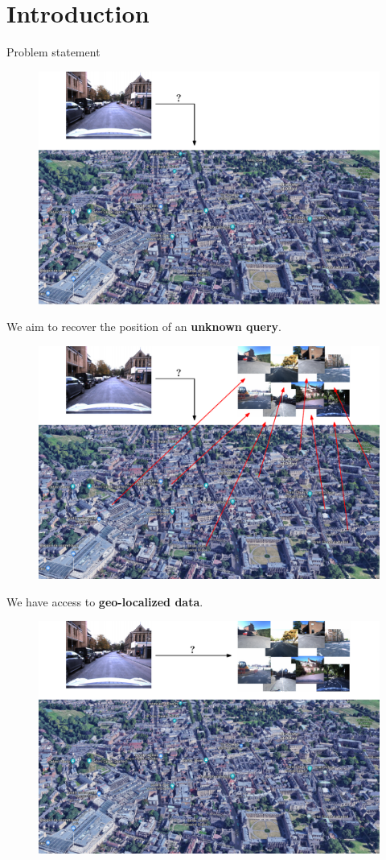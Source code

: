 \section{Introduction}

\label{sec:intro}

\begin{frame}{Problem statement}
	\only<1>
	{
	\vfill
	\begin{figure}
		\includegraphics[width=0.8\linewidth]{vect/intro/fig1/1}
	\end{figure}
	\vfill	
	We aim to recover the position of an \textbf{unknown query}.
	}
	{
	\vfill
	\begin{figure}
		\includegraphics[width=0.8\linewidth]{vect/intro/fig1/2}
	\end{figure}
	\vfill	
	We have access to \textbf{geo-localized data}.
	}
	{
	\vfill
	\begin{figure}
		\includegraphics[width=0.8\linewidth]{vect/intro/fig1/3}

\end{figure}}
\end{frame}
